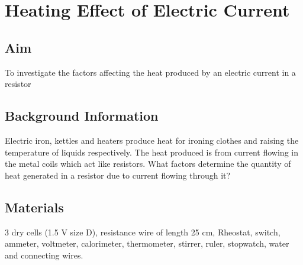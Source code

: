 \chapter{Heating Effect of Electric Current}

\section{Aim}
To investigate the factors affecting the heat produced by an electric current in a resistor

\section{Background Information}
Electric iron, kettles and heaters produce heat for ironing clothes and raising the temperature of liquids respectively. The heat produced is from current flowing in the metal coils which act like resistors. What factors determine the quantity of heat generated in a resistor due to current flowing through it?

\section{Materials}
3 dry cells (1.5 V size D), resistance wire of length 25 cm, Rheostat, switch, ammeter, voltmeter, calorimeter, thermometer, stirrer, ruler, stopwatch, water and connecting wires.

